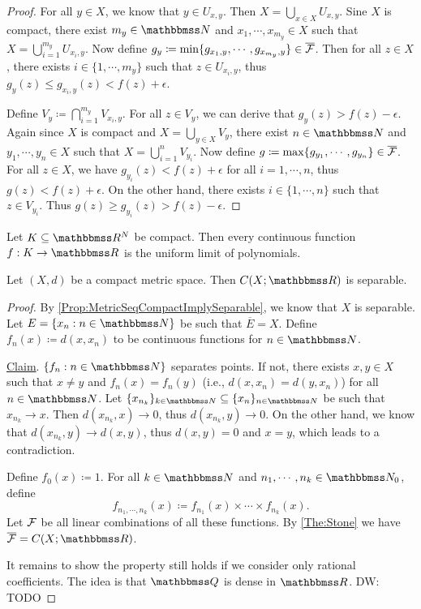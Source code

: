 \documentclass[screen,single]{techreport}
\numberwithin{equation}{section}
\newcommand{\diw}[1]{{\color{Red} DW: #1}}
\begin{document}
\begin{proof}
  For all $y \in X$, we know that $y \in U_{x,y}$.
  Then $X = \bigcup_{x \in X} U_{x,y}$.
  Sine $X$ is compact, there exist $m_y \in \bbN$ and $x_1,\cdots,x_{m_y} \in X$ such that $X = \bigcup_{i=1}^{m_y} U_{x_i,y}$.
  Now define $g_y \coloneqq \min\{ g_{x_1,y},\cdots,g_{x_{m_y},y}\} \in \overline{\mathcal{F}}$.
  Then for all $z \in X$, there exists $i \in \{1,\cdots,m_y\}$ such that $z \in U_{x_i,y}$, thus $g_y(z) \le g_{x_i,y}(z) < f(z) + \epsilon$.
  
  Define $V_y \coloneqq \bigcap_{i=1}^{m_y} V_{x_i,y}$.
  For all $z \in V_y$, we can derive that $g_y(z) > f(z) - \epsilon$.
  Again since $X$ is compact and $X = \bigcup_{y \in X} V_y$, there exist $n \in \bbN$ and $y_1,\cdots,y_n \in X$ such that $X = \bigcup_{i=1}^n V_{y_i}$.
  Now define $g \coloneqq \max\{ g_{y_1},\cdots,g_{y_n}\} \in \overline{\mathcal{F}}$.
  For all $z \in X$, we have $g_{y_i}(z) < f(z) + \epsilon$ for all $i=1,\cdots,n$, thus $g(z) < f(z) + \epsilon$.
  On the other hand, there exists $i \in \{1,\cdots,n\}$ such that $z \in V_{y_i}$.
  Thus $g(z) \ge g_{y_i}(z) > f(z) - \epsilon$.
\end{proof}

\begin{theorem}[Weierstrass]\label{The:WeierstrassAsCorOfStone}
  Let $K \subseteq \bbR^N$ be compact.
  Then every continuous function $f : K \to \bbR$ is the uniform limit of polynomials.
\end{theorem}

\begin{corollary}\label{Cor:CompactMetricToRSeparable}
  Let $(X,d)$ be a compact metric space.
  Then $C(X;\bbR)$ is separable.
\end{corollary}
\begin{proof}
  By \cref{Prop:MetricSeqCompactImplySeparable}, we know that $X$ is separable.
  Let $E = \{x_n : n \in \bbN\}$ be such that $\overline{E} = X$.
  Define $f_n(x) \coloneqq d(x,x_n)$ to be continuous functions for $n \in \bbN$.
  
  \underline{Claim}. $\{f_n : n \in \bbN\}$ separates points.
  If not, there exists $x,y \in X$ such that $x \ne y$ and $f_n(x) = f_n(y)$ (i.e., $d(x,x_n) = d(y,x_n)$) for all $n \in \bbN$.
  Let $\{x_{n_k}\}_{k \in \bbN} \subseteq \{x_n\}_{n \in \bbN}$ be such that $x_{n_k} \rightarrow x$.
  Then $d(x_{n_k},x) \rightarrow 0$, thus $d(x_{n_k},y) \rightarrow 0$.
  On the other hand, we know that $d(x_{n_k},y) \rightarrow d(x,y)$, thus $d(x,y) = 0$ and $x=y$, which leads to a contradiction.
  
  Define $f_0(x) \coloneqq 1$.
  For all $k \in \bbN$ and $n_1,\cdots,n_k \in \bbN_0$, define
  \[
  f_{n_1,\cdots,n_k}(x) \coloneqq f_{n_1}(x) \times \cdots \times f_{n_k}(x).
  \]
  Let $\mathcal{F}$ be all linear combinations of all these functions.
  By \cref{The:Stone} we have $\overline{\calF} = C(X;\bbR)$.
  
  It remains to show the property still holds if we consider only rational coefficients.
  The idea is that $\bbQ$ is dense in $\bbR$.
  \diw{TODO}
\end{proof}
\end{document}
